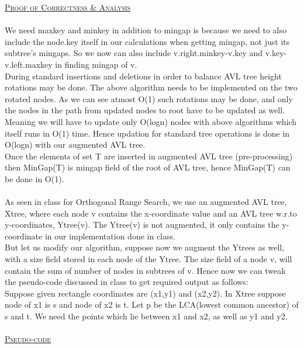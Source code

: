 \documentclass[a4 paper]{article}
\begin{document}
\underline{\textsc{Proof of Correctness \& Analysis}}\\\\
We need maxkey and minkey in addition to mingap is because we need to also include the node.key itself in our calculations when getting mingap, not just its subtree's mingaps. So we now can also include v.right.minkey-v.key and v.key-v.left.maxkey in finding mingap of v.\\ 
During standard insertions and deletions in order to balance AVL tree height rotations may be done. The above algorithm needs to be implemented on the two rotated nodes. As we can see atmost O(1) such rotations may be done, and only the nodes in the path from updated nodes to root have to be updated as well. Meaning we will have to update only O(logn) nodes with above algorithms which itself runs in O(1) time. Hence updation for standard tree operations is done in O(logn) with our augmented AVL tree.\\
Once the elements of set T are inserted in augmented AVL tree (pre-processing) then MinGap(T) is mingap field of the root of AVL tree, hence MinGap(T) can be done in O(1).\\\\
As seen in class for Orthogonal Range Search, we use an augmented AVL tree, Xtree, where each node v contains the x-coordinate value and an AVL tree w.r.to y-coordinates, Ytree(v). The Ytree(v) is not augmented, it only contains the y-coordinate in our implementation done in class.\\
But let us modify our algorithm, suppose now we augment the Ytrees as well, with a size field stored in each node of the Ytree. The size field of a node v,  will contain the sum of number of nodes in subtrees of v. Hence now we can tweak the pseudo-code discussed in class to get required output as follows:\\
Suppose given rectangle coordinates are (x1,y1) and (x2,y2). In Xtree suppose node of x1 is s and node of x2 is t. Let p be the LCA(lowest common ancestor) of s and t. We need the points which lie between x1 and x2, as well as y1 and y2.\\\\
\underline{\textsc{Pseudo-code}}\\\\
\end{document}
